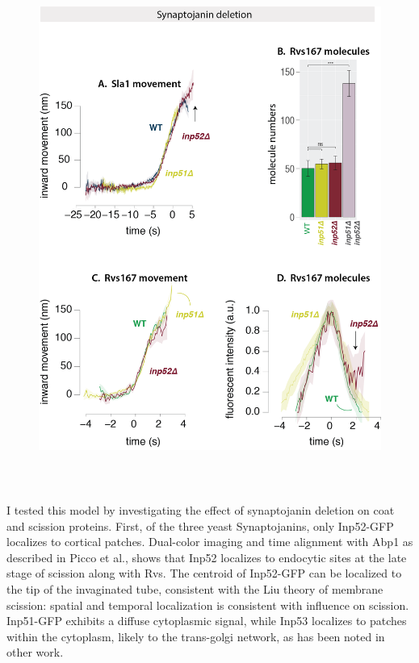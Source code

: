 		\begin{figure}
		\centering
		\includegraphics[width=17cm,height=17cm,keepaspectratio]{figures/results_final/inp_movement3}
		\end{figure}		

	\vspace{5mm}
	I tested this model by investigating the effect of synaptojanin deletion on coat and scission proteins. First, of the three yeast Synaptojanins, only Inp52-GFP localizes to cortical patches. Dual-color imaging and time alignment with Abp1 as described in Picco et al., shows that Inp52 localizes to endocytic sites at the late stage of scission along with Rvs. The centroid of Inp52-GFP can be localized to the tip of the invaginated tube, consistent with the Liu theory of membrane scission: spatial and temporal localization is consistent with influence on scission. Inp51-GFP exhibits a diffuse cytoplasmic signal, while Inp53 localizes to patches within the cytoplasm, likely to the trans-golgi network, as has been noted in other work. 



